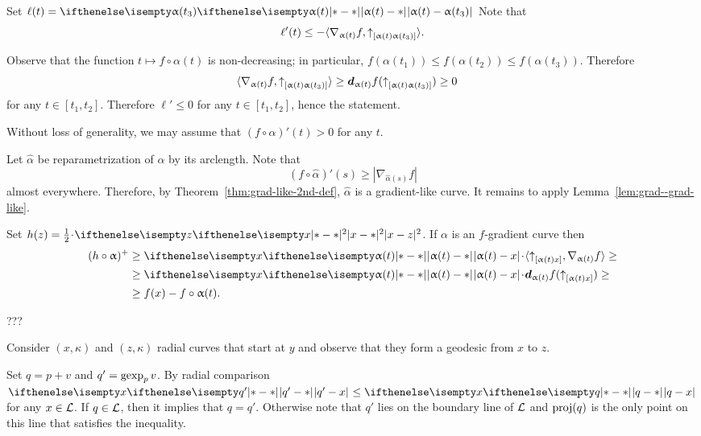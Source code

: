 
Set $\ell(t)=\dist{\alpha(t)}{\alpha(t_3)}{}$
Note that 
\[\ell'(t)\le -\langle \nabla_{\alpha(t)}f,\dir{\alpha(t)}{\alpha(t_3)}\rangle.\]

Observe that the function $t\mapsto f\circ\alpha(t)$ is non-decreasing;
in particular, $f(\alpha(t_1))\le f(\alpha(t_2))\le f(\alpha(t_3))$.
Therefore 
\begin{align*}\langle \nabla_{\alpha(t)}f,\dir{\alpha(t)}{\alpha(t_3)}\rangle&\ge\dd_{\alpha(t)}f(\dir{\alpha(t)}{\alpha(t_3)})\ge 0
\end{align*}
for any $t\in[t_1,t_2]$.
Therefore $\ell'\le 0$ for any $t\in[t_1,t_2]$, hence the statement.

Without loss of generality, we may assume that $(f\circ\alpha)'(t)>0$ for any $t$.

Let $\hat\alpha$ be reparametrization of $\alpha$ by its arclength.
Note that 
\[(f\circ\hat\alpha)'(s)\ge |\nabla_{\hat\alpha(s)}f|\]
almost everywhere.
Therefore, by Theorem~\ref{thm:grad-like-2nd-def}, $\hat\alpha$ is a gradient-like curve.
It remains to apply Lemma~\ref{lem:grad--grad-like}.

Set $h(z)=\tfrac12\cdot\dist[2]{x}{z}{}$.
If $\alpha$ is an $f$-gradient curve then 
\begin{align*}
(h\circ\alpha)^+&\ge \dist{\alpha(t)}{x}{}\cdot\langle\dir{\alpha(t)}{x},\nabla_{\alpha(t)}f\rangle\ge
\\
&\ge \dist{\alpha(t)}{x}{}\cdot\dd_{\alpha(t)}f(\dir{\alpha(t)}{x})\ge 
\\
&\ge f(x)-f\circ\alpha(t).
\end{align*}

???



Consider $(x,\kappa)$ and $(z,\kappa)$ radial curves that start at $y$
and observe that they form a geodesic from $x$ to $z$.

 Set $q=p+v$ and $q'=\mathop{\rm gexp}\nolimits_pv$. 
By radial comparison $\dist{q'}{x}{}\le \dist{q}{x}{}$ for any $x\in \spc{L}$.
If $q\in \spc{L}$, then it implies that $q=q'$.
Otherwise note that $q'$ lies on the boundary line of $\mathcal{L}$ and $\mathop{\rm proj}\nolimits(q)$ is the only point on this line that satisfies the inequality. 

